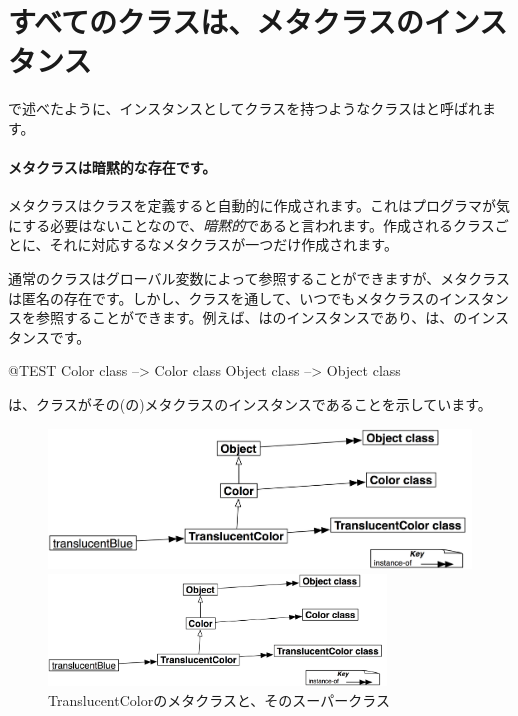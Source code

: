 \documentclass[a4paper,10pt,twoside]{book}
\begin{document}
\section{すべてのクラスは、メタクラスのインスタンス}


で述べたように、インスタンスとしてクラスを持つようなクラスはと呼ばれます。

\paragraph{メタクラスは暗黙的な存在です。}
メタクラスはクラスを定義すると自動的に作成されます。これはプログラマが気にする必要はないことなので、\emph{暗黙的}であると言われます。作成されるクラスごとに、それに対応するなメタクラスが一つだけ作成されます。

通常のクラスはグローバル変数によって参照することができますが、メタクラスは匿名の存在です。しかし、クラスを通して、いつでもメタクラスのインスタンスを参照することができます。例えば、はのインスタンスであり、は、のインスタンスです。
\begin{code}{@TEST}
Color class   --> Color class
Object class --> Object class
\end{code}

\noindent
{}は、クラスがその(の)メタクラスのインスタンスであることを示しています。

\begin{center}
\begin{figure}[!ht]
\ifluluelse
	{\centerline {\includegraphics[width=\textwidth]{TranslucentMetaclasses}}}
	{\centerline {\includegraphics[width=0.8\textwidth]{TranslucentMetaclasses}}}
\caption{TranslucentColorのメタクラスと、そのスーパークラス}
\end{figure}
\end{center}
\end{document}
